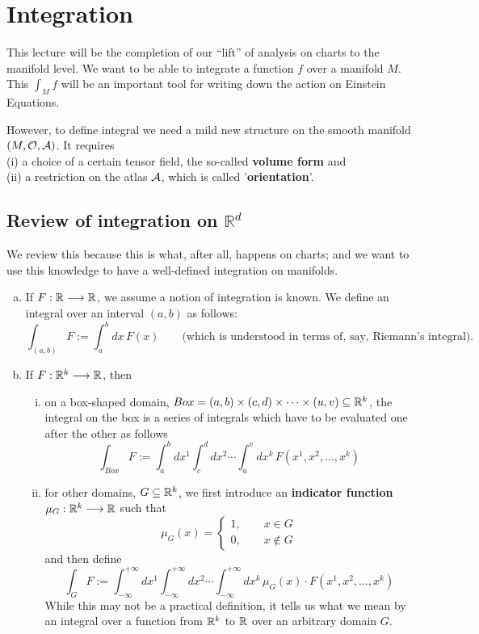 \section{Integration}
\begin{framed}
This lecture will be the completion of our ``lift'' of analysis on charts to the manifold level. We want to be able to integrate a function $f$ over a manifold $M$. This $\int_{M} f$ will be an important tool for writing down the action on Einstein Equations.

However, to define integral we need a mild new structure on the smooth manifold $(M, \mathcal{O}, \mathcal{A})$. It requires \\
(i) a choice of a certain tensor field, the so-called \textbf{volume form} and \\
(ii) a restriction on the atlas $\mathcal{A}$, which is called '\textbf{orientation}'.
\end{framed}

\subsection{Review of integration on $\mathbb{R}^d$}
We review this because this is what, after all, happens on charts; and we want to use this knowledge to have a well-defined integration on manifolds.
\begin{enumerate}[a)]
\item If $F : \mathbb{R} \longrightarrow \mathbb{R}$, we assume a notion of integration is known. We define an integral over an interval $(a,b)$ as follows: \\
\[
\int_{(a,b)} F := \int_a^b dx \, F(x) \quad\quad \text{(which is understood in terms of, say, Riemann's integral)}.
\]

\item If $F : \mathbb{R}^k \longrightarrow \mathbb{R}$, then
\begin{enumerate}[(i)]
\item on a box-shaped domain, $Box = (a,b) \times (c,d) \times \dotsb \times (u,v) \subseteq \mathbb{R}^k$, the integral on the box is a series of integrals which have to be evaluated one after the other as follows \\
\[
\int_{Box} F := \int_a^b dx^1 \int_c^d dx^2 \dotsi \int_u^v dx^k \, F(x^1, x^2, \dotsc, x^k)
\]
\item for other domains, $G \subseteq \mathbb{R}^k$, we first introduce an \textbf{indicator function} $\mu_G : \mathbb{R}^k \longrightarrow \mathbb{R}$ such that
\[
\mu_G(x) = \begin{cases}
               1, \quad \quad x \in G \\
               0, \quad \quad x \not\in G
            \end{cases}
\]
and then define
\[
\int_{G} F := \int_{-\infty}^{+\infty} dx^1 \int_{-\infty}^{+\infty} dx^2 \dotsi \int_{-\infty}^{+\infty} dx^k \, \mu_G(x) \cdot F(x^1, x^2, \dotsc, x^k)
\]
While this may not be a practical definition, it tells us what we mean by an integral over a function from $\mathbb{R}^k$ to $\mathbb{R}$ over an arbitrary domain $G$.
\end{enumerate}
\end{enumerate}

